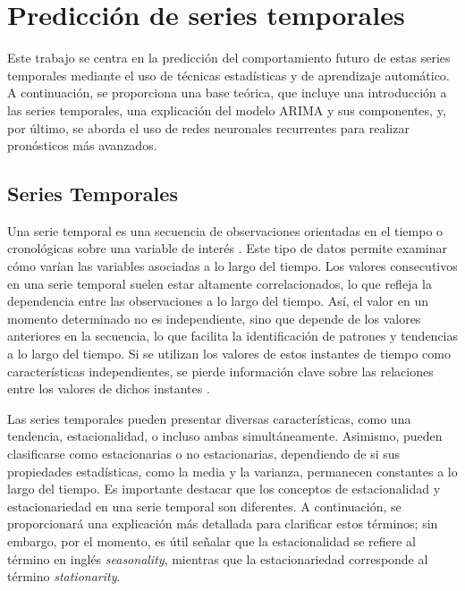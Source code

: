 \clearpage %
\chapter{Predicción de series temporales}
\label{sec:Prediccion de series temporales}

Este trabajo se centra en la predicción del comportamiento futuro de estas series temporales mediante el uso de técnicas estadísticas y de aprendizaje automático. A continuación, se proporciona una base teórica, que incluye una introducción a las series temporales, una explicación del modelo ARIMA y sus componentes, y, por último, se aborda el uso de redes neuronales recurrentes para realizar pronósticos más avanzados.

\section{Series Temporales}

Una serie temporal es una secuencia de observaciones orientadas en el tiempo o cronológicas sobre una variable de interés \cite{kulahci2015introduction}. Este tipo de datos permite examinar cómo varían las variables asociadas a lo largo del tiempo. Los valores consecutivos en una serie temporal suelen estar altamente correlacionados, lo que refleja la dependencia entre las observaciones a lo largo del tiempo. Así, el valor en un momento determinado no es independiente, sino que depende de los valores anteriores en la secuencia, lo que facilita la identificación de patrones y tendencias a lo largo del tiempo. Si se utilizan los valores de estos instantes de tiempo como características independientes, se pierde información clave sobre las relaciones entre los valores de dichos instantes \cite{aggarwal2018neural}. 


Las series temporales pueden presentar diversas características, como una tendencia, estacionalidad, o incluso ambas simultáneamente. Asimismo, pueden clasificarse como estacionarias o no estacionarias, dependiendo de si sus propiedades estadísticas, como la media y la varianza, permanecen constantes a lo largo del tiempo. Es importante destacar que los conceptos de estacionalidad y estacionariedad en una serie temporal son diferentes. A continuación, se proporcionará una explicación más detallada para clarificar estos términos; sin embargo, por el momento, es útil señalar que la estacionalidad se refiere al término en inglés \textit{seasonality}, mientras que la estacionariedad corresponde al término \textit{stationarity}.

